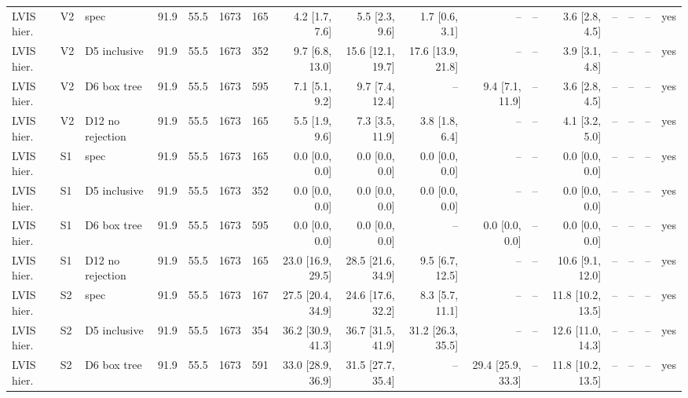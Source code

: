 \begin{tabular}{lllrrrrrrrrrrrrrl}
\midrule
LVIS hier. & V2 & spec & 91.9 & 55.5 & 1673 & 165 & 4.2 \scriptsize{[1.7, 7.6]} & 5.5 \scriptsize{[2.3, 9.6]} & 1.7 \scriptsize{[0.6, 3.1]} & -- & -- & 3.6 \scriptsize{[2.8, 4.5]} & -- & -- & -- & yes \\
LVIS hier. & V2 & D5 inclusive & 91.9 & 55.5 & 1673 & 352 & 9.7 \scriptsize{[6.8, 13.0]} & 15.6 \scriptsize{[12.1, 19.7]} & 17.6 \scriptsize{[13.9, 21.8]} & -- & -- & 3.9 \scriptsize{[3.1, 4.8]} & -- & -- & -- & yes \\
LVIS hier. & V2 & D6 box tree & 91.9 & 55.5 & 1673 & 595 & 7.1 \scriptsize{[5.1, 9.2]} & 9.7 \scriptsize{[7.4, 12.4]} & -- & 9.4 \scriptsize{[7.1, 11.9]} & -- & 3.6 \scriptsize{[2.8, 4.5]} & -- & -- & -- & yes \\
LVIS hier. & V2 & D12 no rejection & 91.9 & 55.5 & 1673 & 165 & 5.5 \scriptsize{[1.9, 9.6]} & 7.3 \scriptsize{[3.5, 11.9]} & 3.8 \scriptsize{[1.8, 6.4]} & -- & -- & 4.1 \scriptsize{[3.2, 5.0]} & -- & -- & -- & yes \\
LVIS hier. & S1 & spec & 91.9 & 55.5 & 1673 & 165 & 0.0 \scriptsize{[0.0, 0.0]} & 0.0 \scriptsize{[0.0, 0.0]} & 0.0 \scriptsize{[0.0, 0.0]} & -- & -- & 0.0 \scriptsize{[0.0, 0.0]} & -- & -- & -- & yes \\
LVIS hier. & S1 & D5 inclusive & 91.9 & 55.5 & 1673 & 352 & 0.0 \scriptsize{[0.0, 0.0]} & 0.0 \scriptsize{[0.0, 0.0]} & 0.0 \scriptsize{[0.0, 0.0]} & -- & -- & 0.0 \scriptsize{[0.0, 0.0]} & -- & -- & -- & yes \\
LVIS hier. & S1 & D6 box tree & 91.9 & 55.5 & 1673 & 595 & 0.0 \scriptsize{[0.0, 0.0]} & 0.0 \scriptsize{[0.0, 0.0]} & -- & 0.0 \scriptsize{[0.0, 0.0]} & -- & 0.0 \scriptsize{[0.0, 0.0]} & -- & -- & -- & yes \\
LVIS hier. & S1 & D12 no rejection & 91.9 & 55.5 & 1673 & 165 & 23.0 \scriptsize{[16.9, 29.5]} & 28.5 \scriptsize{[21.6, 34.9]} & 9.5 \scriptsize{[6.7, 12.5]} & -- & -- & 10.6 \scriptsize{[9.1, 12.0]} & -- & -- & -- & yes \\
LVIS hier. & S2 & spec & 91.9 & 55.5 & 1673 & 167 & 27.5 \scriptsize{[20.4, 34.9]} & 24.6 \scriptsize{[17.6, 32.2]} & 8.3 \scriptsize{[5.7, 11.1]} & -- & -- & 11.8 \scriptsize{[10.2, 13.5]} & -- & -- & -- & yes \\
LVIS hier. & S2 & D5 inclusive & 91.9 & 55.5 & 1673 & 354 & 36.2 \scriptsize{[30.9, 41.3]} & 36.7 \scriptsize{[31.5, 41.9]} & 31.2 \scriptsize{[26.3, 35.5]} & -- & -- & 12.6 \scriptsize{[11.0, 14.3]} & -- & -- & -- & yes \\
LVIS hier. & S2 & D6 box tree & 91.9 & 55.5 & 1673 & 591 & 33.0 \scriptsize{[28.9, 36.9]} & 31.5 \scriptsize{[27.7, 35.4]} & -- & 29.4 \scriptsize{[25.9, 33.3]} & -- & 11.8 \scriptsize{[10.2, 13.5]} & -- & -- & -- & yes \\

\end{tabular}
